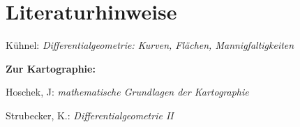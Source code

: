 \chapter*{Literaturhinweise}

Kühnel: \textit{Differentialgeometrie: Kurven, Flächen, Mannigfaltigkeiten}

\textbf{Zur Kartographie:}\par
Hoschek, J: \textit{mathematische Grundlagen der Kartographie} \par
Strubecker, K.: \textit{Differentialgeometrie II}